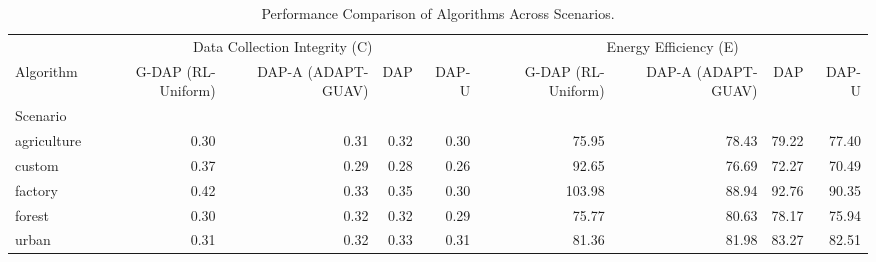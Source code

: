 \begin{table}
\caption{Performance Comparison of Algorithms Across Scenarios.}
\label{tab:static_results_summary}
\begin{tabular}{lrrrrrrrr}
\toprule
 & \multicolumn{4}{c}{Data Collection Integrity (C)} & \multicolumn{4}{c}{Energy Efficiency (E)} \\
Algorithm & G-DAP (RL-Uniform) & DAP-A (ADAPT-GUAV) & DAP & DAP-U & G-DAP (RL-Uniform) & DAP-A (ADAPT-GUAV) & DAP & DAP-U \\
Scenario &  &  &  &  &  &  &  &  \\
\midrule
agriculture & 0.30 & 0.31 & 0.32 & 0.30 & 75.95 & 78.43 & 79.22 & 77.40 \\
custom & 0.37 & 0.29 & 0.28 & 0.26 & 92.65 & 76.69 & 72.27 & 70.49 \\
factory & 0.42 & 0.33 & 0.35 & 0.30 & 103.98 & 88.94 & 92.76 & 90.35 \\
forest & 0.30 & 0.32 & 0.32 & 0.29 & 75.77 & 80.63 & 78.17 & 75.94 \\
urban & 0.31 & 0.32 & 0.33 & 0.31 & 81.36 & 81.98 & 83.27 & 82.51 \\
\bottomrule
\end{tabular}
\end{table}
